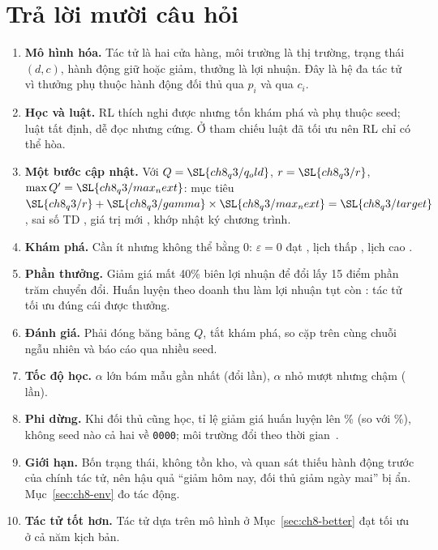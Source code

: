 
\section{Trả lời mười câu hỏi}

\begin{enumerate}
  \item \textbf{Mô hình hóa.} Tác tử là hai cửa hàng, môi trường là thị trường, trạng thái $(d,c)$, hành động giữ hoặc giảm, thưởng là lợi nhuận. Đây là hệ đa tác tử vì thưởng phụ thuộc hành động đối thủ qua $p_i$ và qua $c_i$.
  \item \textbf{Học và luật.} RL thích nghi được nhưng tốn khám phá và phụ thuộc seed; luật tất định, dễ đọc nhưng cứng. Ở tham chiếu luật đã tối ưu nên RL chỉ có thể hòa.
  \item \textbf{Một bước cập nhật.} Với $Q=\SL{ch8_q3/q_old}$, $r=\SL{ch8_q3/r}$, $\max Q'=\SL{ch8_q3/max_next}$: mục tiêu $\SL{ch8_q3/r}+\SL{ch8_q3/gamma}\times\SL{ch8_q3/max_next}=\SL{ch8_q3/target}$, sai số TD , giá trị mới , khớp nhật ký chương trình.
  \item \textbf{Khám phá.} Cần ít nhưng không thể bằng 0: $\varepsilon=0$ đạt , lịch thấp , lịch cao .
  \item \textbf{Phần thưởng.} Giảm giá mất 40\% biên lợi nhuận để đổi lấy 15 điểm phần trăm chuyển đổi. Huấn luyện theo doanh thu làm lợi nhuận tụt còn : tác tử tối ưu đúng cái được thưởng.
  \item \textbf{Đánh giá.} Phải đóng băng bảng $Q$, tắt khám phá, so cặp trên cùng chuỗi ngẫu nhiên và báo cáo qua nhiều seed.
  \item \textbf{Tốc độ học.} $\alpha$ lớn bám mẫu gần nhất (đổi  lần), $\alpha$ nhỏ mượt nhưng chậm ( lần).
  \item \textbf{Phi dừng.} Khi đối thủ cũng học, tỉ lệ giảm giá huấn luyện lên \% (so với \%), không seed nào cả hai về \texttt{0000}; môi trường đổi theo thời gian~\cite{ch8:busoniu2008}.
  \item \textbf{Giới hạn.} Bốn trạng thái, không tồn kho, và quan sát thiếu hành động trước của chính tác tử, nên hậu quả ``giảm hôm nay, đối thủ giảm ngày mai'' bị ẩn. Mục~\ref{sec:ch8-env} đo tác động.
  \item \textbf{Tác tử tốt hơn.} Tác tử dựa trên mô hình ở Mục~\ref{sec:ch8-better} đạt tối ưu ở cả năm kịch bản.
\end{enumerate}


